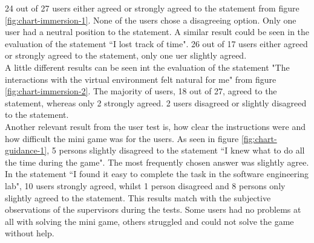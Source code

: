 24 out of 27 users either agreed or strongly agreed to the statement from figure \ref{fig:chart-immersion-1}. None of the users chose a disagreeing option. Only one user had a neutral position to the statement. A similar result could be seen in the evaluation of the statement ``I lost track of time". 26 out of 17 users either agreed or strongly agreed to the statement, only one uer slightly agreed. \\
A little different results can be seen int the evaluation of the statement "The interactions with the virtual environment felt natural for me" from figure \ref{fig:chart-immersion-2}. The majority of users, 18 out of 27, agreed to the statement, whereas only 2 strongly agreed. 2 users disagreed or slightly disagreed to the statement.\\
Another relevant result from the user test is, how clear the instructions were and how difficult the mini game was for the users. As seen in figure \ref{fig:chart-guidance-1}, 5 persons slightly disagreed to the statement ``I knew what to do all the time during the game". The most frequently chosen answer was slightly agree. In the statement ``I found it easy to complete the task in the software engineering lab", 10 users strongly agreed, whilst 1 person disagreed and 8 persons only slightly agreed to the statement. This results match with the subjective observations of the supervisors during the tests. Some users had no problems at all with solving the mini game, others struggled and could not solve the game without help.
